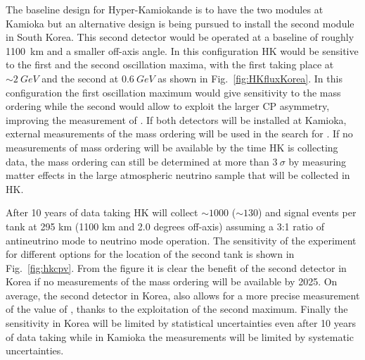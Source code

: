 The baseline design  for Hyper-Kamiokande is to have the two modules at Kamioka but an alternative design is being pursued to install the second module in South Korea. This second detector would be operated at a baseline of roughly 1100~km and a smaller off-axis angle. In this configuration HK would be sensitive to the first and the second oscillation maxima, with the first taking place at $\sim2~GeV$ and the second at $0.6~GeV$ as shown in Fig.~\ref{fig:HKfluxKorea}. In this configuration the first oscillation maximum would give sensitivity to the mass ordering while the second would allow to exploit the larger CP asymmetry, improving the measurement of \dcp.  If both detectors will be installed at Kamioka, external measurements of the mass ordering will be used in the search for \dcp. If no measurements of mass ordering will be available by the time HK is collecting data, the mass ordering can still be determined at more than $3~\sigma$ by measuring matter effects in the large atmospheric neutrino sample that will be collected in HK.    

After 10 years of data taking  HK will collect $\sim1000$ ($\sim130$) \nue and \nueb signal events per tank at 295 km (1100 km and 2.0 degrees off-axis) assuming a 3:1 ratio of antineutrino mode to neutrino mode operation. The sensitivity of the experiment for different options for the location of the second tank is shown in Fig.~\ref{fig:hkcpv}. From the figure it is clear the benefit of the second detector in Korea if no measurements of the mass ordering will be available by 2025. On average, the second detector in Korea, also allows for a more precise measurement of the value of \dcp, thanks to the exploitation of the second maximum. Finally the sensitivity in Korea will be limited by statistical uncertainties even after 10 years of data taking while in Kamioka the measurements will be limited by systematic uncertainties.

